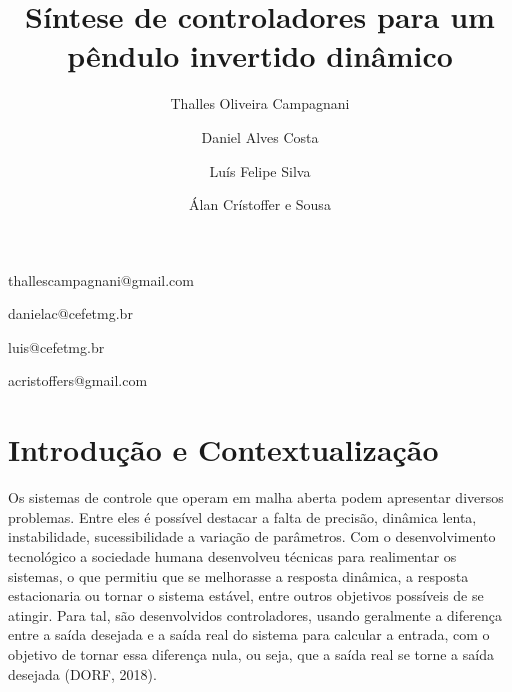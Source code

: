 \documentclass[conference,harvard,brazil,english]{sbatex}
\begin{document}
    \title{Síntese de controladores para um pêndulo invertido dinâmico}
    \author{Thalles Oliveira Campagnani}{thallescampagnani@gmail.com}
    \author{  Daniel Alves Costa}{danielac@cefetmg.br}
    \author{  Luís Felipe Silva}{luis@cefetmg.br}
    \author{  Álan Crístoffer e Sousa}{acristoffers@gmail.com}
    \section{Introdução e Contextualização}
        
        Os sistemas de controle que operam em malha aberta podem apresentar diversos problemas. Entre eles é possível destacar a falta de precisão, dinâmica lenta, instabilidade, sucessibilidade a variação de parâmetros. Com o desenvolvimento tecnológico a sociedade humana desenvolveu técnicas para realimentar os sistemas, o que permitiu que se melhorasse a resposta dinâmica, a resposta estacionaria ou tornar o sistema estável, entre outros objetivos possíveis de se atingir. Para tal, são desenvolvidos controladores, usando geralmente a diferença entre a saída desejada e a saída real do sistema para calcular a entrada, com o objetivo de tornar essa diferença nula, ou seja, que a saída real se torne a saída desejada (DORF, 2018).
        
\end{document}

